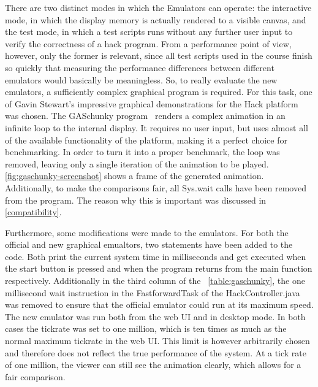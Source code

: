 There are two distinct modes in which the Emulators can operate: the interactive mode, in which the display memory is actually rendered to a visible canvas, and the test mode, in which a test scripts runs without any further user input to verify the correctness of a hack program.
From a performance point of view, however, only the former is relevant, since all test scripts used in the course finish so quickly that measuring the performance differences between different emulators would basically be meaningless.
So, to really evaluate the new emulators, a sufficiently complex graphical program is required. For this task, one of Gavin Stewart's impressive graphical demonstrations for the Hack platform was chosen.
The GASchunky program~\cite{demos} renders a complex animation in an infinite loop to the internal display. It requires no user input, but uses almost all of the available functionality of the platform, making it a perfect choice for benchmarking. In order to turn it into a proper benchmark, the loop was removed, leaving only a single iteration of the animation to be played.
\cref{fig:gaschunky-screenshot} shows a frame of the generated animation.
Additionally, to make the comparisons fair, all Sys.wait calls have been removed from the program. The reason why this is important was discussed in \cref{compatibility}.

Furthermore, some modifications were made to the emulators. For both the official and new graphical emualtors, two statements have been added to the code. Both print the current system time in milliseconds and get executed when the start button is pressed and when the program returns from the main function respectively. Additionally in the third column of the ~\cref{table:gaschunky}, the one millisecond wait instruction in the FastforwardTask of the HackController.java was removed to ensure that the official emulator could run at its maximum speed.
The new emulator was run both from the web UI and in desktop mode. In both cases the tickrate was set to one million, which is ten times as much as the normal maximum tickrate in the web UI. This limit is however arbitrarily chosen and therefore does not reflect the true performance of the system. At a tick rate of one million, the viewer can still see the animation clearly, which allows for a fair comparison.

